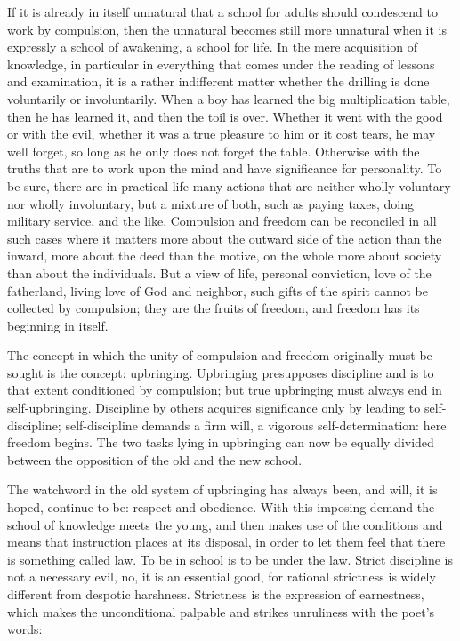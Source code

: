 \documentclass[12pt,a4paper,openany]{book}
\newcommand{\opage}[1]{\marginnote{\footnotesize\textit{[#1]}}}
\begin{document}
If it is already in itself unnatural that a school for
adults should condescend to work by compulsion, then
the unnatural becomes still more unnatural when
it is expressly a school of awakening, a school for life.
In the mere acquisition of knowledge, in particular in
everything that comes under the reading of lessons and examination,
it is a rather indifferent matter whether the drilling
is done voluntarily or involuntarily. When a boy has learned
the big multiplication table, then he has learned it, and then the toil is
over. Whether it went with the good or with
the evil, whether it was a true pleasure to him or it
cost tears, he may well forget, so long as he only
does not forget the table. Otherwise with the truths
that are to work upon the mind and have significance for personality.
To be sure, there are in practical life
many actions that are neither wholly voluntary
nor wholly involuntary, but a mixture of both,
such as paying taxes, doing military service, and the like.
Compulsion and freedom can be reconciled in all such cases
where it matters more about the outward side of the action
than the inward, more about the deed than
the motive, on the whole more about society than about
the individuals. But a view of life, personal conviction,
love of the fatherland, living love of God
and neighbor, such gifts of the spirit cannot be collected
by compulsion; they are the fruits of freedom, and freedom
has its beginning in itself.

The concept in which the unity of compulsion and freedom originally
must be sought is the concept: upbringing. Upbringing
\setcounter{footnote}{0}%
\opage{414}presupposes discipline and is to that extent conditioned by compulsion;
but true upbringing must always end in self-upbringing.
Discipline by others acquires significance only by
leading to self-discipline; self-discipline demands a firm
will, a vigorous self-determination: here freedom begins.
The two tasks lying in upbringing can now be
equally divided between the opposition of the old and
the new school.

The watchword in the old system of upbringing has always
been, and will, it is hoped, continue to be: respect and
obedience. With this imposing demand the school of knowledge
meets the young, and then makes use of the conditions
and means that instruction places at its disposal,
in order to let them feel that there is something called
law. To be in school is to be under the law.
Strict discipline is not a necessary evil, no,
it is an essential good, for rational strictness is widely
different from despotic harshness. Strictness is the expression
of earnestness, which makes the unconditional palpable and strikes
unruliness with the poet's words:
\end{document}
